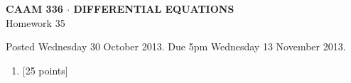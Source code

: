 \documentclass[10pt]{article}
\begin{document}
\vspace*{-5em}
\begin{center}
\large \textsf{\textbf{CAAM 336 $\cdot$ DIFFERENTIAL EQUATIONS}\\[0.5em]
Homework 35 }
\end{center}

Posted Wednesday 30 October 2013. Due 5pm Wednesday 13 November 2013.

\begin{enumerate}\addtocounter{enumi}{34}
\item {[25 points]}\\  

\end{enumerate}
\end{document}
